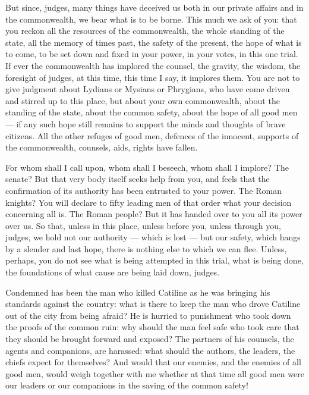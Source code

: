  But since, judges, many things have deceived us both in our private affairs and in the commonwealth, we bear what is to be borne. This much we ask of you: that you reckon all the resources of the commonwealth, the whole standing of the state, all the memory of times past, the safety of the present, the hope of what is to come, to be set down and fixed in your power, in your votes, in this one trial. If ever the commonwealth has implored the counsel, the gravity, the wisdom, the foresight of judges, at this time, this time I say, it implores them. You are not to give judgment about Lydians or Mysians or Phrygians, who have come driven and stirred up to this place, but about your own commonwealth, about the standing of the state, about the common safety, about the hope of all good men --- if any such hope still remains to support the minds and thoughts of brave citizens. All the other refuges of good men, defences of the innocent, supports of the commonwealth, counsels, aids, rights have fallen.

 For whom shall I call upon, whom shall I beseech, whom shall I implore? The senate? But that very body itself seeks help from you, and feels that the confirmation of its authority has been entrusted to your power. The Roman knights? You will declare to fifty leading men of that order what your decision concerning all is. The Roman people? But it has handed over to you all its power over us. So that, unless in this place, unless before you, unless through you, judges, we hold not our authority --- which is lost --- but our safety, which hangs by a slender and last hope, there is nothing else to which we can flee. Unless, perhaps, you do not see what is being attempted in this trial, what is being done, the foundations of what cause are being laid down, judges.

 Condemned has been the man who killed Catiline as he was bringing his standards against the country: what is there to keep the man who drove Catiline out of the city from being afraid? He is hurried to punishment who took down the proofs of the common ruin: why should the man feel safe who took care that they should be brought forward and exposed? The partners of his counsels, the agents and companions, are harassed: what should the authors, the leaders, the chiefs expect for themselves? And would that our enemies, and the enemies of all good men, would weigh together with me whether at that time all good men were our leaders or our companions in the saving of the common safety!

